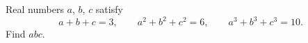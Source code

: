 Real numbers $a$, $b$, $c$ satisfy
\[a+b+c=3,\qquad a^2+b^2+c^2=6,\qquad a^3+b^3+c^3=10.\]
Find $abc$.
